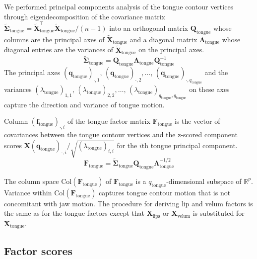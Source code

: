 \documentclass[preprint]{JASAnew}\usepackage[]{graphicx}\usepackage[]{color}
\begin{document}
We performed principal components analysis of the tongue contour vertices through eigendecomposition of the covariance matrix $\boldsymbol{\tilde{\Sigma}}_\text{tongue} = \mathbf{\tilde{X}}_\text{tongue}^\intercal \mathbf{\tilde{X}}_\text{tongue}/(n-1)$ into an orthogonal matrix $\mathbf{Q}_\text{tongue}$ whose columns are the principal axes of $\mathbf{\tilde{X}}_\text{tongue}$ and a diagonal matrix $\boldsymbol{\Lambda}_\text{tongue}$ whose diagonal entries are the variances of $\mathbf{\tilde{X}}_\text{tongue}$ on the principal axes.
% 
\begin{equation}
\boldsymbol{\tilde{\Sigma}}_\text{tongue} = \mathbf{Q}_\text{tongue} \boldsymbol{\Lambda}_\text{tongue} \mathbf{Q}_\text{tongue}^{-1}
\end{equation}
%
The principal axes $(\mathbf{q}_\text{tongue})_{\cdot,1}$, $(\mathbf{q}_\text{tongue})_{\cdot,2}, \ldots$, $(\mathbf{q}_\text{tongue})_{\cdot,q_\text{tongue}}$ and the variances $(\lambda_\text{tongue})_{1,1}$, $(\lambda_\text{tongue})_{2,2}, \ldots$, $(\lambda_\text{tongue})_{q_\text{tongue},q_\text{tongue}}$ on these axes capture the direction and variance of tongue motion.


Column $(\mathbf{f}_\text{tongue})_{\cdot,i}$ of the tongue factor matrix $\mathbf{F}_\text{tongue}$ is the vector of covariances between the tongue contour vertices and the z-scored component scores $\mathbf{X} (\mathbf{q}_\text{tongue})_{\cdot,i} / \sqrt{(\lambda_\text{tongue})_{i,i}}$ for the $i$th tongue principal component. 
%
\begin{equation}
\mathbf{F}_\text{tongue}
 = \boldsymbol{\tilde{\Sigma}}_\text{tongue} \mathbf{Q}_\text{tongue} \boldsymbol{\Lambda}_\text{tongue}^{-1/2}
\end{equation}


The column space $\mathrm{Col}(\mathbf{F}_\text{tongue})$ of $\mathbf{F}_\text{tongue}$ is a $q_\text{tongue}$-dimensional subspace of $\mathbb{R}^p$. 
%
Variance within $\mathrm{Col}(\mathbf{F}_\text{tongue})$ captures tongue contour motion that is not concomitant with jaw motion. 
%
The procedure for deriving lip and velum factors is the same as for the tongue factors except that $\mathbf{X}_\text{lips}$ or $\mathbf{X}_\text{velum}$ is substituted for $\mathbf{X}_\text{tongue}$.




\subsection{Factor scores}
\label{subsec:weights}
\end{document}
